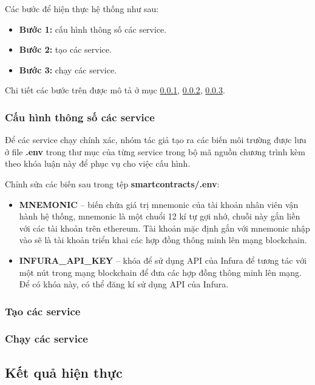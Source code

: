 \documentclass[../main-report.tex]{subfiles}
\begin{document}
Các bước để hiện thực hệ thống như sau:

\begin{itemize}
\item \textbf{Bước 1:} cấu hình thông số các \gls{service}.
\item \textbf{Bước 2:} tạo các \gls{service}.
\item \textbf{Bước 3:} chạy các \gls{service}.
\end{itemize}

Chi tiết các bước trên được mô tả ở mục \ref{sec:configure-service}, \ref{sec:build-service}, \ref{sec:run-service}.

\subsubsection{Cấu hình thông số các service}
\label{sec:configure-service}
Để các service chạy chính xác, nhóm tác giả tạo ra các biến môi trường được lưu ở file \textbf{.env} trong thư mục của từng service trong bộ mã nguồn chương trình kèm theo khóa luận này để phục vụ cho việc cấu hình.

Chỉnh sửa các biến sau trong tệp \textbf{smartcontracts/.env}:

\begin{itemize}
\item \textbf{MNEMONIC} -- biến chứa giá trị mnemonic của tài khoản nhân viên vận hành hệ thống, mnemonic là một chuổi 12 kí tự gợi nhớ, chuỗi này gắn liền với các tài khoản trên ethereum. Tài khoản mặc định gắn với mnemonic nhập vào sẽ là tài khoản triển khai các hợp đồng thông minh lên mạng blockchain.
\item \textbf{INFURA\_API\_KEY} -- khóa để sử dụng API của Infura để tương tác với một nút trong mạng blockchain để đưa các hợp đồng thông minh lên mạng. Để có khóa này, có thể đăng kí sử dụng API của Infura.

\end{itemize}
\subsubsection{Tạo các service}
\label{sec:build-service}

\subsubsection{Chạy các service}
\label{sec:run-service}

\subsection{Kết quả hiện thực}
\end{document}
